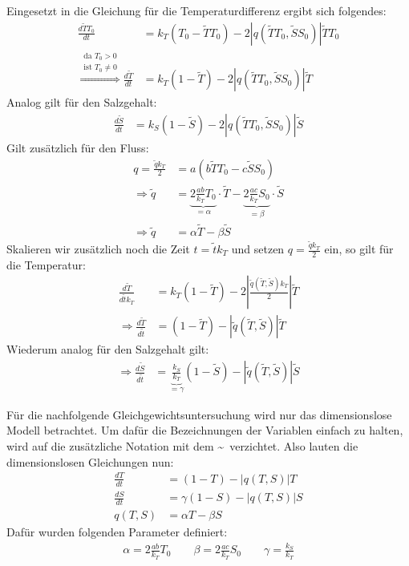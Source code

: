 \documentclass[a4paper,twoside]{article}
\begin{document}
	Eingesetzt in die Gleichung für die Temperaturdifferenz ergibt sich folgendes:
	\begin{align*}
		\frac{d\tilde{T} T_0}{dt} &= k_T\left(T_{0} - \tilde{T} T_0 \right) - 2\left|q(\tilde{T} T_0,\tilde{S} S_0)\right| \tilde{T} T_0 \\
		\stackrel{
			\substack{
				\textrm{da } T_0 > 0\\
				\textrm{ist } T_0 \neq 0
			}
		}{\Rightarrow}
		\frac{d\tilde{T}}{dt} &= k_T\left(1 - \tilde{T}\right) - 2\left|q(\tilde{T} T_0,\tilde{S} S_0)\right| \tilde{T}
	\end{align*}
	Analog gilt für den Salzgehalt:
	\begin{align*}
		\frac{d\tilde{S}}{dt} &= k_S\left(1 - \tilde{S}\right) - 2\left|q(\tilde{T} T_0,\tilde{S} S_0)\right| \tilde{S}
	\end{align*}
	Gilt zusätzlich für den Fluss:
	\begin{align*}
		q = \frac{\tilde{q} k_T}{2} &= a \left( b\tilde{T}T_0 - c\tilde{S}S_0 \right) \\
		\Rightarrow \tilde{q} &= \underbrace{2\frac{ab}{k_T}T_0}_{= \alpha} \cdot \tilde{T} - \underbrace{2\frac{ac}{k_T}S_0}_{=\beta} \cdot \tilde{S} \\
		\Rightarrow \tilde{q} &= \alpha\tilde{T} - \beta\tilde{S}
	\end{align*}
	Skalieren wir zusätzlich noch die Zeit \(t = \tilde{t} k_T\) und setzen \(q = \frac{\tilde{q}k_T}{2}\) ein, so gilt für die Temperatur:
	\begin{align*}
		\frac{d\tilde{T}}{d\tilde{t} k_T} &= k_T\left(1 - \tilde{T}\right) - 2\left|\frac{\tilde{q}(\tilde{T},\tilde{S})k_T}{2}\right| \tilde{T} \\
		\Rightarrow \frac{d\tilde{T}}{d\tilde{t}} &= (1 - \tilde{T}) - \left| \tilde{q}(\tilde{T},\tilde{S})\right|\tilde{T}
	\end{align*}
	Wiederum analog für den Salzgehalt gilt:
	\begin{align*}
		\Rightarrow \frac{d\tilde{S}}{d\tilde{t}} &= \underbrace{\frac{k_S}{k_T}}_{=\gamma}(1 - \tilde{S}) - \left| \tilde{q}(\tilde{T},\tilde{S})\right|\tilde{S}
	\end{align*}
	
	Für die nachfolgende Gleichgewichtsuntersuchung wird nur das dimensionslose Modell betrachtet. Um dafür die Bezeichnungen der Variablen einfach zu halten, wird auf die zusätzliche Notation mit dem \textasciitilde\ verzichtet. Also lauten die dimensionslosen Gleichungen nun:
	\begin{align*}
		\frac{dT}{dt} &= (1 - T) - \left| q(T,S)\right|T \\
		\frac{dS}{dt} &= \gamma (1 - S) - \left| q(T,S)\right|S \\
		q(T,S) &= \alpha T - \beta S
	\end{align*}
	Dafür wurden folgenden Parameter definiert:
	\begin{align*}
		\alpha = 2\frac{ab}{k_T}T_0 \qquad
		\beta = 2\frac{ac}{k_T}S_0 \qquad
		\gamma = \frac{k_S}{k_T}
	\end{align*}
	
\end{document}
